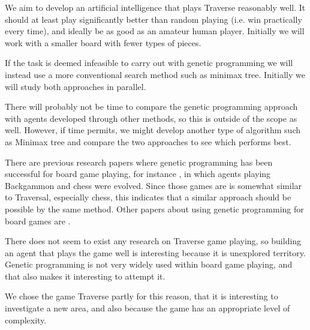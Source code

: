 \documentclass[times, 10pt,twocolumn]{article}
\begin{document}


We aim to develop an artificial intelligence that plays Traverse reasonably well. It should at least play significantly better than random playing (i.e. win practically every time), and ideally be as good as an amateur human player. Initially we will work with a smaller board with fewer types of pieces.

If the task is deemed infeasible to carry out with genetic programming we will instead use a more conventional search method such as minimax tree. Initially we will study both approaches in parallel.


There will probably not be time to compare the genetic programming approach with agents developed through other methods, so this is outside of the scope as well. However, if time permits, we might develop another type of algorithm such as Minimax tree and compare the two approaches to see which performs best.


There are previous research papers where genetic programming has been successful for board game playing, for instance \cite{human-competitive_gp}, in which agents playing Backgammon and chess were evolved. Since those games are is somewhat similar to Traversal, especially chess, this indicates that a similar approach should be possible by the same method. Other papers about using genetic programming for board games are \cite{ mancala, othello}.


There does not seem to exist any research on Traverse game playing, so building an agent that plays the game well is interesting because it is unexplored territory. Genetic programming is not very widely used within board game playing, and that also makes it interesting to attempt it.

We chose the game Traverse partly for this reason, that it is interesting to investigate a new area, and also because the game has an appropriate level of complexity.
\end{document}
